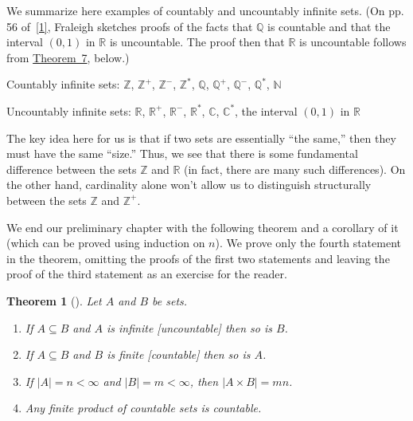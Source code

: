 \documentclass[10pt,]{book}
\theoremstyle{plain}
\newtheorem{theorem}{Theorem}[section]
\theoremstyle{definition}
\theoremstyle{definition}
\theoremstyle{definition}
\theoremstyle{definition}
\numberwithin{equation}{section}
\def\Z{\mathbb{Z}}
\def\R{\mathbb{R}}
\def\Q{\mathbb{Q}}
\def\C{\mathbb{C}}
\def\N{\mathbb{N}}
\newcommand{\lt}{<}
\begin{document}
We summarize here examples of countably and uncountably infinite sets. (On pp. 5\textendash{}6 of~\hyperlink{F}{[1]}, Fraleigh sketches proofs of the facts that \(\Q\) is countable and that the interval \((0,1)\) in \(\R\) is uncountable. The proof then that \(\R\) is uncountable follows from \hyperref[cardthm]{Theorem~7}, below.)%
\par
Countably infinite sets: \(\Z\), \(\Z^+\), \(\Z^-\), \(\Z^*\), \(\Q\), \(\Q^+\), \(\Q^-\), \(\Q^*\), \(\N\)%
\par
Uncountably infinite sets: \(\R\), \(\R^+\), \(\R^-\), \(\R^*\), \(\C\), \(\C^*\),  the interval \((0,1)\) in \(\R\)%
\par
The key idea here for us is that if two sets are essentially ``the same,'' then they must have the same ``size.'' Thus, we see that there is some fundamental difference between the sets \(\Z\) and \(\R\) (in fact, there are many such differences). On the other hand, cardinality alone won't allow us to distinguish structurally between the sets \(\Z\) and \(\Z^+\).%
\par
We end our preliminary chapter with the following theorem and a corollary of it (which can be proved using induction on \(n\)). We prove only the fourth statement in the theorem, omitting the proofs of the first two statements and leaving the proof of the third statement as an exercise for the reader.%
\begin{theorem}[{}]\label{cardthm}
Let \(A\) and \(B\) be sets. \leavevmode%
\begin{enumerate}
\item\hypertarget{li-19}{}If \(A\subseteq B\) and \(A\) is infinite [uncountable] then so is \(B\).%
\item\hypertarget{li-20}{}If \(A\subseteq B\) and \(B\) is finite [countable] then so is \(A\).%
\item\hypertarget{li-21}{}If \(|A|=n\lt \infty\) and \(|B|=m\lt  \infty\), then \(|A\times B|=mn\).%
\item\hypertarget{li-22}{}Any finite product of countable sets is countable.%
\end{enumerate}
%
\end{theorem}
\end{document}

